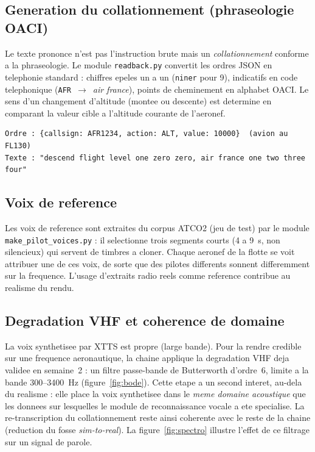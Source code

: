 \documentclass[11pt,a4paper]{article}
\begin{document}
\subsection{Generation du collationnement (phraseologie OACI)}

Le texte prononce n'est pas l'instruction brute mais un \emph{collationnement}
conforme a la phraseologie. Le module \texttt{readback.py} convertit les ordres JSON
en telephonie standard : chiffres epeles un a un (\texttt{niner} pour 9), indicatifs
en code telephonique (\texttt{AFR}~$\rightarrow$~\emph{air france}), points de
cheminement en alphabet OACI. Le sens d'un changement d'altitude (montee ou descente)
est determine en comparant la valeur cible a l'altitude courante de l'aeronef.

\begin{lstlisting}[caption={Exemple de collationnement genere a partir d'un ordre JSON.}]
Ordre : {callsign: AFR1234, action: ALT, value: 10000}  (avion au FL130)
Texte : "descend flight level one zero zero, air france one two three four"
\end{lstlisting}

\subsection{Voix de reference}

Les voix de reference sont extraites du corpus ATCO2 (jeu de test) par le module
\texttt{make\_pilot\_voices.py} : il selectionne trois segments courts (4 a 9~s, non
silencieux) qui servent de timbres a cloner. Chaque aeronef de la flotte se voit
attribuer une de ces voix, de sorte que des pilotes differents sonnent differemment
sur la frequence. L'usage d'extraits radio reels comme reference contribue au realisme
du rendu.

\subsection{Degradation VHF et coherence de domaine}

La voix synthetisee par XTTS est propre (large bande). Pour la rendre credible sur une
frequence aeronautique, la chaine applique la degradation VHF deja validee en
semaine~2 : un filtre passe-bande de Butterworth d'ordre~6, limite a la bande
300--3400~Hz (figure~\ref{fig:bode}). Cette etape a un second interet, au-dela du
realisme : elle place la voix synthetisee dans le \emph{meme domaine acoustique} que
les donnees sur lesquelles le module de reconnaissance vocale a ete specialise. La
re-transcription du collationnement reste ainsi coherente avec le reste de la chaine
(reduction du fosse \emph{sim-to-real}). La figure~\ref{fig:spectro} illustre l'effet
de ce filtrage sur un signal de parole.
\end{document}

